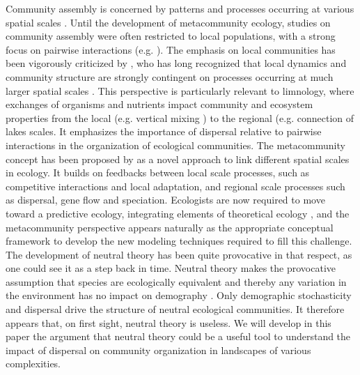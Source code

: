 \documentclass[12pt]{article}
\begin{document}
Community assembly is concerned by patterns and processes occurring at various spatial scales \parencite{Levin1992}. Until the development of metacommunity ecology, studies on community assembly were often restricted to local populations, with a strong focus on pairwise interactions (e.g. \textcite{MacArthur1972, May1973,Pimm1982,DeAngelis1992}). The emphasis on local communities has been vigorously criticized by \textcite{Ricklefs2008}, who has long recognized that local dynamics and community structure are strongly contingent on processes occurring at much larger spatial scales \parencite{Ricklefs1987}. This perspective is particularly relevant to limnology, where exchanges of organisms and nutrients impact community and ecosystem properties from the local (e.g. vertical mixing \parencite{Ryabov2011}) to the regional (e.g. connection of lakes \parencite{Leibold2004b} scales. It emphasizes the importance of dispersal relative to pairwise interactions in the organization of ecological communities. The metacommunity concept has been proposed by \textcite{Leibold2004a} as a novel approach to link different spatial scales in ecology. It builds on feedbacks between local scale processes, such as competitive interactions and local adaptation, and regional scale processes such as dispersal, gene flow and speciation. Ecologists are now required to move toward a predictive ecology, integrating elements of theoretical ecology \parencite{Thuiller2013}, and the metacommunity perspective appears naturally as the appropriate conceptual framework to develop the new modeling techniques required to fill this challenge. The development of neutral theory has been quite provocative in that respect, as one could see it as a step back in time. Neutral theory makes the provocative assumption that species are ecologically equivalent and thereby any variation in the environment has no impact on demography \parencite{Bell2000,Hubbell2001}. Only demographic stochasticity and dispersal drive the structure of neutral ecological communities. It therefore appears that, on first sight, neutral theory is useless.  We will develop in this paper the argument that neutral theory could be a useful tool to understand the impact of dispersal on community organization in landscapes of various complexities. 
\end{document}
